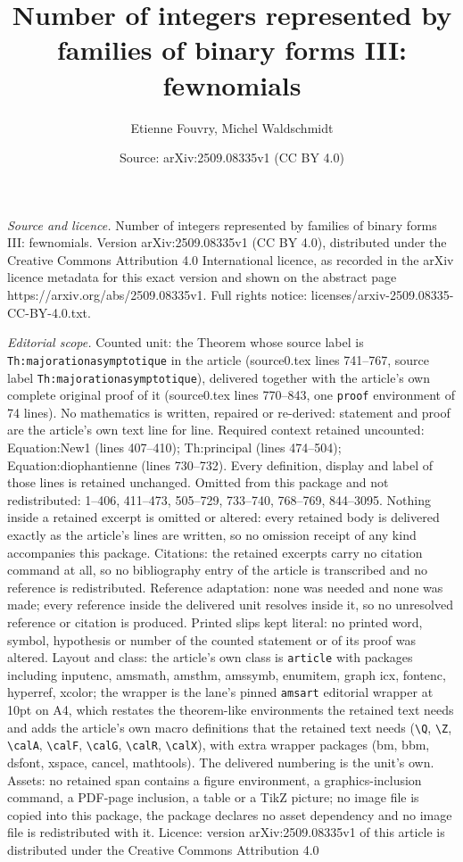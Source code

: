 \documentclass[10pt,a4paper]{amsart}
\title[Number of integers represented by families of binary forms I]{Number of integers represented by families of binary forms III: fewnomials}
\author{Etienne Fouvry, Michel Waldschmidt}
\date{Source: arXiv:2509.08335v1 (CC BY 4.0)}
\begin{document}
\maketitle

\noindent\emph{Source and licence.} Number of integers represented by families of binary forms III: fewnomials. Version arXiv:2509.08335v1 (CC BY 4.0), distributed under the Creative Commons Attribution 4.0 International licence, as recorded in the arXiv licence metadata for this exact version and shown on the abstract page https://arxiv.org/abs/2509.08335v1. Full rights notice: licenses/arxiv-2509.08335-CC-BY-4.0.txt.\par\smallskip

\noindent\textit{Editorial scope.} Counted unit: the Theorem whose source label is \texttt{Th:majorationasymptotique} in the article (source0.tex lines 741--767, source label \texttt{Th:majorationasymptotique}), delivered together with the article's own complete original proof of it (source0.tex lines 770--843, one \texttt{proof} environment of 74 lines). No mathematics is written, repaired or re-derived: statement and proof are the article's own text line for line. Required context retained uncounted: Equation:New1 (lines 407--410); Th:principal (lines 474--504); Equation:diophantienne (lines 730--732). Every definition, display and label of those lines is retained unchanged. Omitted from this package and not redistributed: 1--406, 411--473, 505--729, 733--740, 768--769, 844--3095. Nothing inside a retained excerpt is omitted or altered: every retained body is delivered exactly as the article's lines are written, so no omission receipt of any kind accompanies this package. Citations: the retained excerpts carry no citation command at all, so no bibliography entry of the article is transcribed and no reference is redistributed. Reference adaptation: none was needed and none was made; every reference inside the delivered unit resolves inside it, so no unresolved reference or citation is produced. Printed slips kept literal: no printed word, symbol, hypothesis or number of the counted statement or of its proof was altered. Layout and class: the article's own class is \texttt{article} with packages including inputenc, amsmath, amsthm, amssymb, enumitem, graph icx, fontenc, hyperref, xcolor; the wrapper is the lane's pinned \texttt{amsart} editorial wrapper at 10pt on A4, which restates the theorem-like environments the retained text needs and adds the article's own macro definitions that the retained text needs (\texttt{\textbackslash Q}, \texttt{\textbackslash Z}, \texttt{\textbackslash calA}, \texttt{\textbackslash calF}, \texttt{\textbackslash calG}, \texttt{\textbackslash calR}, \texttt{\textbackslash calX}), with extra wrapper packages (bm, bbm, dsfont, xspace, cancel, mathtools). The delivered numbering is the unit's own. Assets: no retained span contains a figure environment, a graphics-inclusion command, a PDF-page inclusion, a table or a TikZ picture; no image file is copied into this package, the package declares no asset dependency and no image file is redistributed with it. Licence: version arXiv:2509.08335v1 of this article is distributed under the Creative Commons Attribution 4.0 
\end{document}
